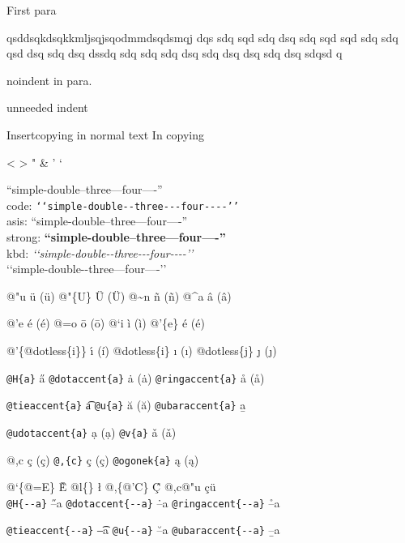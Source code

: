 \documentclass{book}
\newcommand\Texinfocommandstyletextkbd[1]{{\ttfamily\textsl{#1}}}%
\renewcommand{\_}{\Texinfounderscore\discretionary{}{}{}}
\begin{document}
First para

\noindent{}qsddsqkdsqkkmljsqjsqodmmdsqdsmqj dqs sdq sqd sdq dsq sdq sqd sqd sdq sdq 
qsd dsq sdq dsq dssdq sdq sdq sdq dsq sdq dsq dsq sdq dsq sdqsd q

\noindent{}noindent in para.

unneeded indent

Insertcopying in normal text
In copying

<
>
"
\&
'
`

``simple-double--three---four----''\leavevmode{}\\
code: \texttt{{`}{`}simple-double{-}{-}three{-}{-}{-}four{-}{-}{-}-{'}{'}} \leavevmode{}\\
asis: ``simple-double--three---four----'' \leavevmode{}\\
strong: \textbf{``simple-double--three---four----''} \leavevmode{}\\
kbd: \Texinfocommandstyletextkbd{{`}{`}simple-double{-}{-}three{-}{-}{-}four{-}{-}{-}-{'}{'}} \leavevmode{}\\

`\hbox{}`simple-double-\hbox{}-three---four----'\hbox{}'\leavevmode{}\\

%
%
%
%

@"u \"{u} (ü)
@"\{U\} \"{U} (Ü) 
@\~{}n \~{n} (ñ)
@\^{}a \^{a} (â)

@'e \'{e} (é)
@=o \={o} (ō)
@`i \`{i} (ì)
@'\{e\} \'{e} (é)

@'\{@dotless\{i\}\} \'{\i{}} (í)
@dotless\{i\} \i{} (ı)
@dotless\{j\} \j{} (ȷ)

\texttt{@H\{a\}} \H{a}
\texttt{@dotaccent\{a\}} \.{a} (ȧ)
\texttt{@ringaccent\{a\}} \r{a} (å)

\texttt{@tieaccent\{a\}} \t{a}
\texttt{@u\{a\}} \u{a} (ă)
\texttt{@ubaraccent\{a\}} \b{a}

\texttt{@udotaccent\{a\}} \d{a} (ạ)
\texttt{@v\{a\}} \v{a} (ǎ)

@,c \c{c} (ç)
\texttt{@,\{c\}} \c{c} (ç)
\texttt{@ogonek\{a\}} \k{a} (ą)

@`\{@=E\} \`{\={E}}
@l\{\} \l{}
@,\{@'C\} \c{\'{C}}
@,c@"u \c{c}\"{u} \leavevmode{}\\

\texttt{@H\{{-}{-}a\}} \H{--a}
\texttt{@dotaccent\{{-}{-}a\}} \.{--a}
\texttt{@ringaccent\{{-}{-}a\}} \r{--a}

\texttt{@tieaccent\{{-}{-}a\}} \t{--a}
\texttt{@u\{{-}{-}a\}} \u{--a}
\texttt{@ubaraccent\{{-}{-}a\}} \b{--a}
\end{document}

